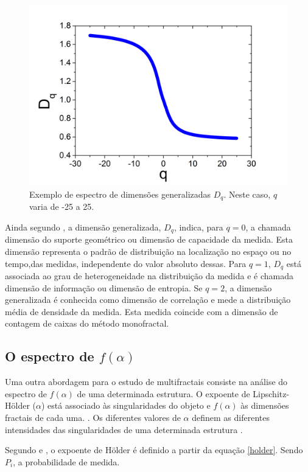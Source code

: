 \documentclass{ufscThesis}
\begin{document}
\begin{figure}[!h]
\centering
\includegraphics[scale=0.3]{qDq.png}
\caption{Exemplo de espectro de dimensões generalizadas $D_{q}$. Neste caso, $q$ varia de -25 a 25.}
\label{qdq}
\end{figure}

Ainda segundo , a dimensão generalizada, $D_{q}$, indica, para $q=0$, a chamada dimensão do suporte geométrico ou dimensão de capacidade da medida. Esta dimensão representa o padrão de distribuição na localização no espaço ou no tempo,das medidas, independente do valor absoluto dessas. Para $q=1$, $D_{q}$ está associada ao grau de heterogeneidade na distribuição da medida e é chamada dimensão de informação ou dimensão de entropia. Se $q=2$, a dimensão generalizada é conhecida como dimensão de correlação e mede a distribuição média de densidade da medida. Esta medida coincide com a dimensão de contagem de caixas do método monofractal.


\subsection{O espectro de $f(\alpha)$}

Uma outra abordagem para o estudo de multifractais consiste na análise do espectro de $f(\alpha)$ de uma determinada estrutura. 
O expoente de Lipschitz-Hölder ($\alpha$) está associado às singularidades do objeto e $f(\alpha)$ às dimensões fractais de cada uma. \cite{feder1988fractals}. Os diferentes valores de $\alpha$ definem as diferentes intensidades das singularidades de uma determinada estrutura \cite{Chhabra1989}. \par
Segundo  e , o expoente de Hölder é definido a partir da equação \ref{holder}. Sendo $P_{i}$, a probabilidade de medida.
\end{document}
